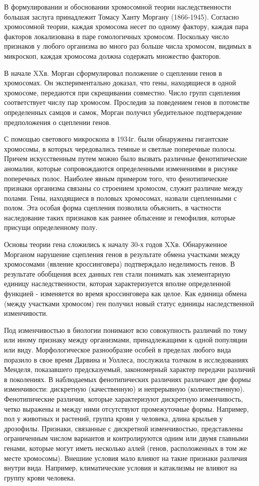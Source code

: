 \documentclass[exam_answers.tex]{subfiles}
\begin{document}
В формулировании и обосновании хромосомной теории
наследственности большая заслуга принадлежит Томасу Ханту Моргану
(1866-1945). Согласно хромосомной теории, каждая хромосома несет по
одному фактору, каждая пара факторов локализована в паре гомологичных
хромосом. Поскольку число признаков у любого организма во много раз
больше числа хромосом, видимых в микроскоп, каждая хромосома должна
содержать множество факторов.

В начале XXв. Морган сформулировал положение о сцеплении генов в
хромосомах. Он экспериментально доказал, что гены, находящиеся в одной
хромосоме, передаются при скрещивании совместно. Число групп сцепления
соответствует числу пар хромосом. Проследив за поведением генов в потомстве
определенных самцов и самок, Морган получил убедительное подтверждение
предположения о сцеплении генов.

С помощью светового микроскопа в 1934г. были обнаружены гигантские
хромосомы, в которых чередовались темные и светлые поперечные полосы.
Причем искусственным путем можно было вызвать различные фенотипические
аномалии, которые сопровождаются определенными изменениями в рисунке
поперечных полос. Наиболее явным примером того, что фенотипические
признаки организма связаны со строением хромосом, служит различие между
полами. Гены, находящиеся в половых хромосомах, назвали сцепленными с
полом. Эта особая форма сцепления позволила объяснить, в частности
наследование таких признаков как раннее облысение и гемофилия, которые
присущи определенному полу.

Основы теории гена сложились к началу 30-х годов XXв. Обнаруженное
Морганом нарушение сцепления генов в результате обмена участками между
хромосомами (явление кроссинговера) подтверждало неделимость генов. В
результате обобщения всех данных ген стали понимать как элементарную
единицу наследственности, которая характеризуется вполне определенной
функцией - изменяется во время кроссинговера как целое. Как единица обмена
(между участками хромосом) ген получил новый статус единицы
наследственной изменчивости.

Под изменчивостью в биологии понимают всю совокупность различий по
тому или иному признаку между организмами, принадлежащими к одной
популяции или виду. Морфологическое разнообразие особей в пределах любого
вида поразило в свое время Дарвина и Уоллеса, послужила толчком в
исследованиях Менделя, показавшего предсказуемый, закономерный характер
передачи различий в поколениях. В наблюдаемых фенотипических различиях
различают две формы изменчивости: дискретную (качественную) и
непрерывную (количественную). Фенотипические различия, которые
характеризуют дискретную изменчивость, четко выражены и между ними
отсутствуют промежуточные формы. Например, пол у животных и растений,
группа крови у человека, длина крыльев у дрозофилы. Признаки, связанные с
дискретной изменчивостью, представлены ограниченным числом вариантов и
контролируются одним или двумя главными генами, которые могут иметь
несколько аллей (генов, расположенных в том же месте хромосомы). Внешние
условия мало влияют на такие признаки различия внутри вида. Например,
климатические условия и катаклизмы не влияют на группу крови человека.
\end{document}
